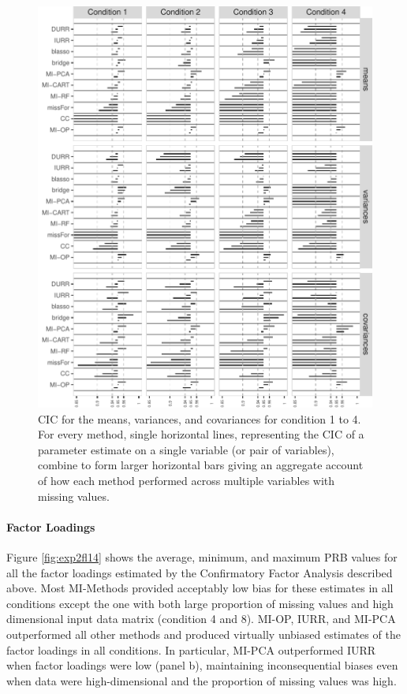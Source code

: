 \begin{figure}
	\includegraphics{../../output/graphs/exp2_semR_ci_58_summy.pdf}
\caption{CIC for the means, variances, and covariances for condition 1 to 4.
	For every method, single horizontal lines, representing the CIC of a parameter estimate on 
	a single variable (or pair of variables), combine to form larger horizontal bars giving an 
	aggregate account of how each method performed across multiple variables with missing values.
}
\label{fig:exp2cir58}
\end{figure}

\FloatBarrier %

	\paragraph{Factor Loadings}
	Figure \ref{fig:exp2fl14} shows the average, minimum, and maximum PRB values for all the factor loadings 
	estimated by the Confirmatory Factor Analysis described above. 
	Most MI-Methods provided acceptably low bias for these estimates in all conditions except the one with 
	both large proportion of missing values and high dimensional input data matrix (condition 4 and 8).
	MI-OP, IURR, and MI-PCA outperformed all other methods and produced virtually unbiased estimates
	of the factor loadings in all conditions.
	In particular, MI-PCA outperformed IURR when factor loadings were low (panel b), 
	maintaining inconsequential biases even when data were high-dimensional and the proportion of missing 
	values was high.

